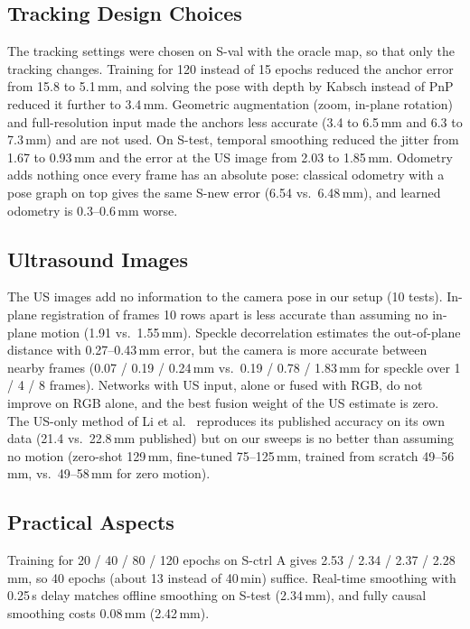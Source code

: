 \documentclass[journal]{IEEEtran}
\newcommand{\Sval}{S-val}
\newcommand{\Stest}{S-test}
\newcommand{\Snew}{S-new}
\newcommand{\Sctrl}{S-ctrl}
\begin{document}
\subsection{Tracking Design Choices}
\label{sec:res_tracking}
The tracking settings were chosen on \Sval{} with the oracle map, so that only the tracking changes. Training for 120 instead of 15 epochs reduced the anchor error from 15.8 to 5.1\,mm, and solving the pose with depth by Kabsch instead of PnP reduced it further to 3.4\,mm. Geometric augmentation (zoom, in-plane rotation) and full-resolution input made the anchors less accurate (3.4 to 6.5\,mm and 6.3 to 7.3\,mm) and are not used. On \Stest{}, temporal smoothing reduced the jitter from 1.67 to 0.93\,mm and the error at the US image from 2.03 to 1.85\,mm. Odometry adds nothing once every frame has an absolute pose: classical odometry with a pose graph on top gives the same \Snew{} error (6.54 vs.\ 6.48\,mm), and learned odometry is 0.3--0.6\,mm worse.

\subsection{Ultrasound Images}
\label{sec:res_us}
The US images add no information to the camera pose in our setup (10 tests). In-plane registration of frames 10 rows apart is less accurate than assuming no in-plane motion (1.91 vs.\ 1.55\,mm). Speckle decorrelation estimates the out-of-plane distance with 0.27--0.43\,mm error, but the camera is more accurate between nearby frames (0.07 / 0.19 / 0.24\,mm vs.\ 0.19 / 0.78 / 1.83\,mm for speckle over 1 / 4 / 8 frames). Networks with US input, alone or fused with RGB, do not improve on RGB alone, and the best fusion weight of the US estimate is zero. The US-only method of Li et al.\ \cite{li2024longterm} reproduces its published accuracy on its own data (21.4 vs.\ 22.8\,mm published) but on our sweeps is no better than assuming no motion (zero-shot 129\,mm, fine-tuned 75--125\,mm, trained from scratch 49--56\,mm, vs.\ 49--58\,mm for zero motion).

\subsection{Practical Aspects}
\label{sec:res_practical}
Training for 20 / 40 / 80 / 120 epochs on \Sctrl{} A gives 2.53 / 2.34 / 2.37 / 2.28\,mm, so 40 epochs (about 13 instead of 40\,min) suffice. Real-time smoothing with 0.25\,s delay matches offline smoothing on \Stest{} (2.34\,mm), and fully causal smoothing costs 0.08\,mm (2.42\,mm).
\end{document}
